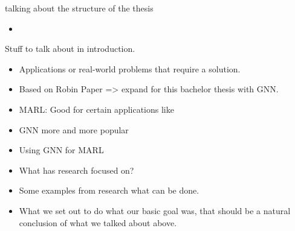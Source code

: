 talking about the structure of the thesis
\begin{itemize}[noitemsep,nolistsep]
	\item 
\end{itemize} \par


Stuff to talk about in introduction.
\begin{itemize}[noitemsep,nolistsep]
	\item Applications or real-world problems that require a solution. 
	\item Based on Robin Paper => expand for this bachelor thesis with GNN.
	\item MARL: Good for certain applications like
	\item GNN more and more popular
	\item Using GNN for MARL
	\item What has research focused on?
	\item Some examples from research what can be done.
	\item What we set out to do what our basic goal was, that should be a natural conclusion of what we talked about above.
\end{itemize}